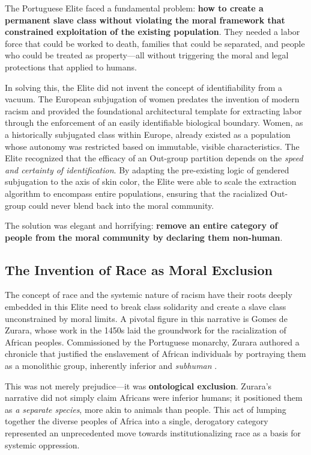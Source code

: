 \documentclass[12pt]{article}
\begin{document}
The Portuguese Elite faced a fundamental problem: \textbf{how to create a permanent slave class without violating the moral framework that constrained exploitation of the existing population}. They needed a labor force that could be worked to death, families that could be separated, and people who could be treated as property---all without triggering the moral and legal protections that applied to humans.

In solving this, the Elite did not invent the concept of identifiability from a vacuum. The European subjugation of women predates the invention of modern racism and provided the foundational architectural template for extracting labor through the enforcement of an easily identifiable biological boundary. Women, as a historically subjugated class within Europe, already existed as a population whose autonomy was restricted based on immutable, visible characteristics. The Elite recognized that the efficacy of an Out-group partition depends on the \textit{speed and certainty of identification}. By adapting the pre-existing logic of gendered subjugation to the axis of skin color, the Elite were able to scale the extraction algorithm to encompass entire populations, ensuring that the racialized Out-group could never blend back into the moral community.

The solution was elegant and horrifying: \textbf{remove an entire category of people from the moral community by declaring them non-human}.

\subsection{The Invention of Race as Moral Exclusion}

The concept of race and the systemic nature of racism have their roots deeply embedded in this Elite need to break class solidarity and create a slave class unconstrained by moral limits. A pivotal figure in this narrative is Gomes de Zurara, whose work in the 1450s laid the groundwork for the racialization of African peoples. Commissioned by the Portuguese monarchy, Zurara authored a chronicle that justified the enslavement of African individuals by portraying them as a monolithic group, inherently inferior and \textit{subhuman} \cite{zurara, kendi}. 

This was not merely prejudice---it was \textbf{ontological exclusion}. Zurara's narrative did not simply claim Africans were inferior humans; it positioned them as \textit{a separate species}, more akin to animals than people. This act of lumping together the diverse peoples of Africa into a single, derogatory category represented an unprecedented move towards institutionalizing race as a basis for systemic oppression.
\end{document}
